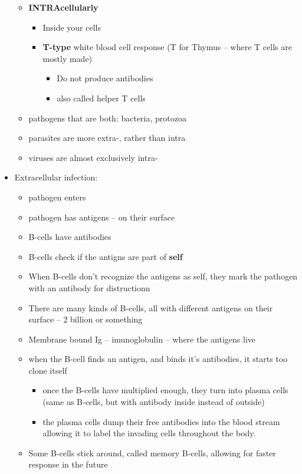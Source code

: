 \documentclass{article}
\theoremstyle{definition}
\begin{document}
\begin{itemize}
\begin{itemize}
\begin{itemize}
\begin{itemize}
						\end{itemize}
				\end{itemize}
			\item \textbf{INTRAcellularly} 
				\begin{itemize}
					\item Inside your cells
					\item \textbf{T-type} white blood cell response (T for Thymus -- where T cells are mostly made)
						\begin{itemize}
							\item Do not produce antibodies
							\item also called helper T cells
						\end{itemize}
				\end{itemize}
			\item pathogens that are both: bacteria, protozoa
			\item parasites are more extra-, rather than intra
			\item viruses are almost exclusively intra-
		\end{itemize}
	\item Extracellular infection:
		\begin{itemize}
			\item pathogen enters
			\item pathogen has antigens -- on their surface
			\item B-cells have antibodies
			\item B-cells check if the antigns are part of \textbf{self} 
			\item When B-cells don't recognize the antigens as self, they mark the pathogen with an antibody for distructionn
			\item There are many kinds of B-cells, all with different antigens on their surface -- 2 billion or something
			\item Membrane bound Ig -- imunoglobulin -- where the antigens live
			\item when the B-cell finds an antigen, and binds it's antibodies, it starts too clone itself
				\begin{itemize}
					\item once the B-cells have multiplied enough, they turn into plasma cells (same as B-cells, but with antibody inside instead of outside)
					\item the plasma cells dump their free antibodies into the blood stream allowing it to label the invading cells throughout the body.
				\end{itemize}
			\item Some B-cells stick around, called memory B-cells, allowing for faster response in the future
		\end{itemize}
\end{itemize}
\end{document}
